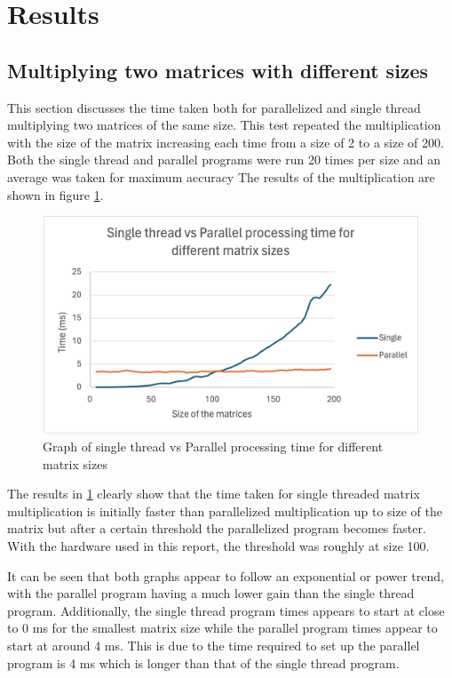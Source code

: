 \section{Results}

\subsection{Multiplying two matrices with different sizes}\label{subsec:res-sizes}
This section discusses the time taken both for parallelized and single thread  multiplying two matrices of the same size.
This test repeated the multiplication with the size of the matrix increasing each time from a size of 2 to a size of 200.
Both the single thread and parallel programs were run 20 times per size and an average was taken for maximum accuracy
The results of the multiplication are shown in figure \ref{fig:Single_thread_vs_Parallel_processing_time}.

\begin{figure}[H]
    \centering
    \includegraphics[width=1\columnwidth]{Figures/Single_thread_vs_Parallel_processing_time_for_different_matrix_sizes}
    \caption{Graph of single thread vs Parallel processing time for different matrix sizes}
    \label{fig:Single_thread_vs_Parallel_processing_time}
\end{figure}

The results in \ref{fig:Single_thread_vs_Parallel_processing_time} clearly show that the time taken for single threaded matrix multiplication is initially faster than parallelized multiplication up to size of the matrix but after a certain threshold the parallelized program becomes faster.
With the hardware used in this report, the threshold was roughly at size 100.


It can be seen that both graphs appear to follow an exponential or power trend, with the parallel program having a much lower gain than the single thread program.
Additionally, the single thread program times appears to start at close to 0 ms for the smallest matrix size while the parallel program times appear to start at around 4 ms.
This is due to the time required to set up the parallel program is 4 ms which is longer than that of the single thread program.


